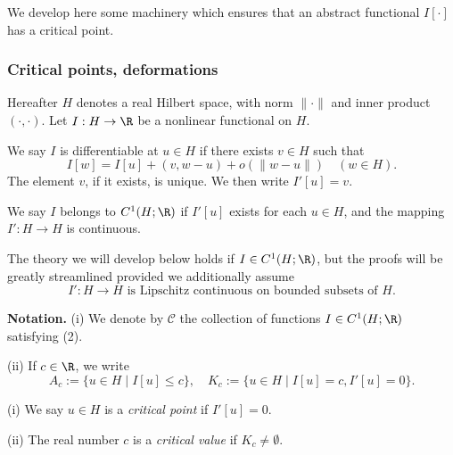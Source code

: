 We develop here some machinery which ensures that an abstract functional $I[\cdot]$ has a critical point.

\subsubsection{Critical points, deformations}

Hereafter $H$ denotes a real Hilbert space, with norm $\|\cdot\|$ and inner product $(\cdot,\cdot)$. Let $I : H \to \R$ be a nonlinear functional on $H$.

\begin{definition}
\label{def:frechet-derivative-hilbert-space}
We say $I$ is differentiable at $u \in H$ if there exists $v \in H$ such that
\[
I[w] = I[u] + (v, w - u) + o(\|w - u\|) \quad (w \in H).
\tag{1}
\]
The element $v$, if it exists, is unique. We then write $I'[u] = v$.
\end{definition}

\begin{definition}
\label{def:c1-functional-class-hilbert}
We say $I$ belongs to $C^1(H;\R)$ if $I'[u]$ exists for each $u \in H$, and the mapping $I' : H \to H$ is continuous.
\end{definition}

\begin{remark}
\label{rem:lipschitz-derivative-simplification}
The theory we will develop below holds if $I \in C^1(H;\R)$, but the proofs will be greatly streamlined provided we additionally assume
\[
I' : H \to H \text{ is Lipschitz continuous on bounded subsets of } H.
\tag{2}
\]
\end{remark}

\noindent\textbf{Notation.} (i) We denote by $\mathcal{C}$ the collection of functions $I \in C^1(H;\R)$ satisfying (2).

(ii) If $c \in \R$, we write
\[
A_c := \{u \in H \mid I[u] \leq c\}, \quad K_c := \{u \in H \mid I[u] = c, I'[u] = 0\}.
\]

\begin{definition}
\label{def:critical-point-critical-value}
(i) We say $u \in H$ is a \textit{critical point} if $I'[u] = 0$.

(ii) The real number $c$ is a \textit{critical value} if $K_c \neq \emptyset$.
\end{definition}

